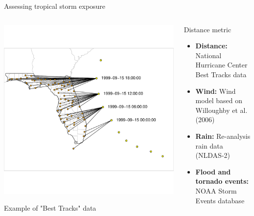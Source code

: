 \documentclass[ignorenonframetext,]{beamer}
\begin{document}
\begin{frame}{Assessing tropical storm exposure}

\begin{columns}
\begin{column}{0.5\textwidth}

\includegraphics[width=\textwidth]{finding_closest_point} 

\vspace{-0.5cm}
\small
Example of "Best Tracks" data
\end{column}
\begin{column}{0.5\textwidth}
\small
\begin{block}{Distance metric}
\begin{itemize}
\item \textbf{Distance:} National Hurricane Center Best Tracks data
\item \textbf{Wind:} Wind model based on Willoughby et al. (2006)
\item \textbf{Rain:} Re-analysis rain data (NLDAS-2)
\item \textbf{Flood and tornado events:} NOAA Storm Events database
\end{itemize}
\end{block}
\end{column}
\end{columns}

\end{frame}
\end{document}
